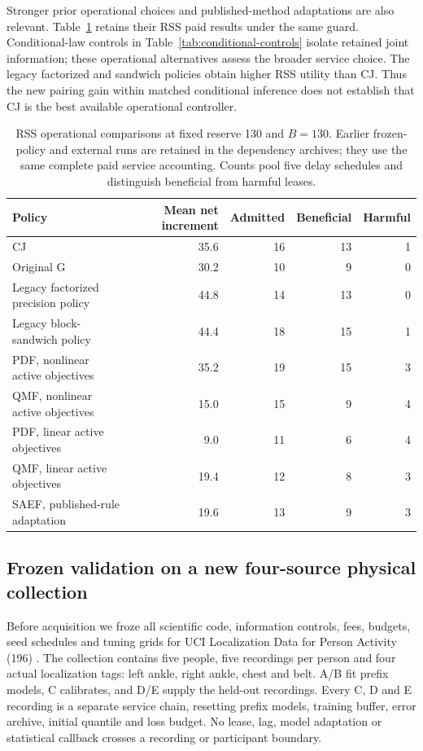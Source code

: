 \documentclass[10pt]{article}
\begin{document}
Stronger prior operational choices and published-method adaptations are
also relevant. Table~\ref{tab:operational-comparison} retains their RSS
paid results under the same guard. Conditional-law controls in
Table~\ref{tab:conditional-controls} isolate retained joint information;
these operational alternatives assess the broader service choice. The
legacy factorized and sandwich policies obtain higher RSS utility than CJ.
Thus the new pairing gain within matched conditional inference does not
establish that CJ is the best available operational controller.

\begin{table}[t]
\centering\small
\caption{RSS operational comparisons at fixed reserve 130 and $B=130$.
Earlier frozen-policy and external runs are retained in the dependency
archives; they use the same complete paid service accounting. Counts pool
five delay schedules and distinguish beneficial from harmful leases.}
\label{tab:operational-comparison}
\begin{tabular}{lrrrr}
\toprule
Policy & Mean net increment & Admitted & Beneficial & Harmful\\
\midrule
CJ & 35.6 & 16 & 13 & 1\\
Original G & 30.2 & 10 & 9 & 0\\
Legacy factorized precision policy & 44.8 & 14 & 13 & 0\\
Legacy block-sandwich policy & 44.4 & 18 & 15 & 1\\
PDF, nonlinear active objectives & 35.2 & 19 & 15 & 3\\
QMF, nonlinear active objectives & 15.0 & 15 & 9 & 4\\
PDF, linear active objectives & 9.0 & 11 & 6 & 4\\
QMF, linear active objectives & 19.4 & 12 & 8 & 3\\
SAEF, published-rule adaptation & 19.6 & 13 & 9 & 3\\
\bottomrule
\end{tabular}
\end{table}

\subsection{Frozen validation on a new four-source physical collection}
Before acquisition we froze all scientific code, information controls,
fees, budgets, seed schedules and tuning grids for UCI Localization Data
for Person Activity (196) \cite{localization196}. The collection contains
five people, five recordings per person and four actual localization tags:
left ankle, right ankle, chest and belt. A/B fit prefix models, C calibrates,
and D/E supply the held-out recordings. Every C, D and E recording is a
separate service chain, resetting prefix models, training buffer, error
archive, initial quantile and loss budget. No lease, lag, model adaptation
or statistical callback crosses a recording or participant boundary.
\end{document}
